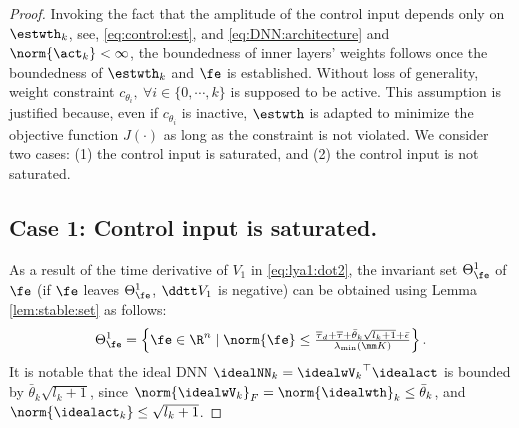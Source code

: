 \documentclass[lettersize,journal]{IEEEtran}
\begin{document}
\begin{proof}

Invoking the fact that the amplitude of the control input depends only on $\estwth_k$, \ie see, \eqref{eq:control:est}, and \eqref{eq:DNN:architecture} and $\norm{\act_k}<\infty$, the boundedness of inner layers' weights follows once the boundedness of $\estwth_k$ and $\fe$ is established.
Without loss of generality, weight constraint $c_{\theta_i},\ \forall i\in\{0,\cdots,k\}$ is supposed to be active.
This assumption is justified because, even if $c_{\theta_i}$ is inactive, $\estwth$ is adapted to minimize the objective function $J(·)$ as long as the constraint is not violated.
We consider two cases: (1) the control input is saturated, and (2) the control input is not saturated.

\subsection*{Case 1: Control input is saturated.}

As a result of the time derivative of $V_1$ in \eqref{eq:lya1:dot2}, the invariant set $\Theta_{\fe}^{1}$ of $\fe$ (\ie if $\fe$ leaves $\Theta_{\fe}^{1}$, $\ddtt V_1$ is negative) can be obtained using Lemma \ref{lem:stable:set} as follows:
\begin{equation}
    \Theta_{\fe}^{1} 
    = 
    \left\{ 
        \fe \in \R^n 
        \mid 
        \norm{\fe} 
        \le 
        \tfrac{
            \overline\tau_d
            +
            \overline\tau
            +
            \bar{\theta}_k\sqrt{l_{k}+1}
            +
            \bar{\epsilon}
        }{
            \lambda_{\min}(\mm K)
        }
    \right\}
    .
    \label{eq:invariant:c1:fe}
\end{equation}
It is notable that the ideal DNN $\idealNN_k={\idealwV_k}^\top\idealact$ is bounded by $\bar{\theta}_k\sqrt{l_{k}+1}$, since $\norm{\idealwV_k}_F = \norm{\idealwth}_k \le \bar{\theta}_k$, and $\norm{\idealact_k}\le \sqrt{l_{k}+1}$.


\end{proof}
\end{document}
